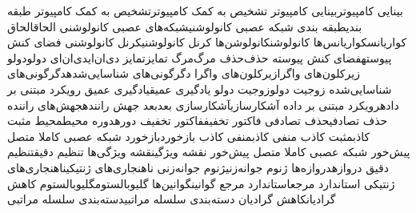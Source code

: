 {بینایی کامپیوتر}{بینایی کامپیوتر}
{تشخیص به کمک کامپیوتر}{تشخیص به کمک کامپیوتر}
{طبقه بندی}{طبقه بندی}
{شبکه عصبی کانولوشنی}{شبکه‌های عصبی کانولوشنی}
{الحاق}{الحاق}
{کواریانس}{کواریانس‌ها}
{کانولوشن}{کانولوشن‌ها}
{کرنل کانولوشنی}{کرنل کانولوشنی}
{فضای کنش پیوسته}{فضای کنش پیوسته}
{‌حذف‌}{‌‌حذف}
{‌مرگ‌}{‌‌مرگ}
{تمایز}{تمایز}
{دی‌ان‌ای}{دی‌ان‌ای}
{دولو}{دولو}
{زیرکلون‌های واگرا}{زیرکلون‌های واگرا}
{دگرگونی‌های شناسایی‌شده}{دگرگونی‌های شناسایی‌‌شده}
{زوجیت دولو}{زوجیت دولو}
{یادگیری عمیق}{یادگیری عمیق}
{رویکرد مبتنی بر داده}{رویکرد مبتنی بر داده}
{آشکارسازی}{آشکارسازی}
{بعد}{بعد}
{جهش راننده}{جهش‌های راننده}
{حذف تصادفی}{حذف تصادفی}
{فاکتور تخفیف}{فاکتور تخفیف}
{دوره}{دوره}
{محیط}{محیط}
{مثبت کاذب}{مثبت کاذب}
{منفی کاذب}{منفی کاذب}
{بازخورد}{بازخورد}
{شبکه عصبی کاملا متصل پیش‌خور }{شبکه عصبی کاملا متصل پیش‌خور }
{نقشه ویژگی}{نقشه ویژگی‌ها}
{تنظیم دقیق}{تنظیم دقیق}
{دروازه}{دروازه‌ها}
{ژنوم جوانه‌زنی}{ژنوم جوانه‌زنی}
{ناهنجاری‌های ژنتیکی}{ناهنجاری‌های ژنتیکی}
{استاندارد مرجع}{استاندارد مرجع}
{گوانین}{گوانین‌ها}
{گلیوبالستوم}{گلیوبالستوم}
{کاهش گرادیان}{کاهش گرادیان}
{دسته‌بندی سلسله مراتبی}{دسته‌بندی سلسله مراتبی}
